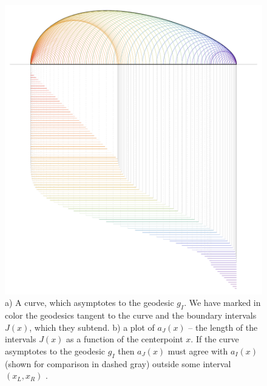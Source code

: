 \documentclass[12pt]{article}
\begin{document}
\begin{figure}[t!]
\centering
{}\includegraphics[width=.5\textwidth]{picnongeodesic.pdf}
\caption{a) A curve, which asymptotes to the geodesic $g_I$. We have marked in color the geodesics tangent to the curve and the boundary intervals $J(x)$, which they subtend. b) a plot of $a_J(x)$ -- the length of the intervals $J(x)$ as a function of the centerpoint $x$. If the curve asymptotes to the geodesic $g_I$ then $a_J(x)$ must agree with $a_I(x)$ (shown for comparison in dashed gray) outside some interval $(x_L, x_R)$ \cite{lampros}.}
\label{picnongeodesic}
\end{figure}
\end{document}
